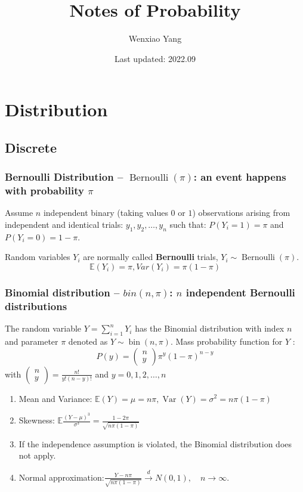 \documentclass[11pt,a4paper]{article}
\title{Notes of Probability}
\author[*]{Wenxiao Yang}
\affil[*]{Department of Mathematics, University of Illinois at Urbana-Champaign}
\date{Last updated: 2022.09}
\begin{document}
\maketitle
\tableofcontents
\newpage

\section{Distribution}

\subsection{Discrete}
\subsubsection{Bernoulli Distribution -- $\operatorname{Bernoulli}(\pi)$: an event happens with probability $\pi$}
Assume $n$ independent binary (taking values $0$ or $1$) observations arising from independent and identical trials: $y_{1}, y_{2}, \ldots, y_{n}$ such that: $P\left(Y_{i}=1\right)=\pi$ and $P\left(Y_{i}=0\right)=1-\pi$.

Random variables $Y_{i}$ are normally called \textbf{Bernoulli} trials, $Y_{i} \sim \operatorname{Bernoulli}(\pi)$. $$\mathbb{E}(Y_i)=\pi,Var(Y_i)=\pi(1-\pi)$$

\subsubsection{Binomial distribution -- $bin(n,\pi)$: $n$ independent Bernoulli distributions}
The random variable $Y=\sum_{i=1}^{n} Y_{i}$ has the Binomial distribution with index $n$ and parameter $\pi$ denoted as $Y \sim \operatorname{bin}(n, \pi)$.
Mass probability function for $Y$ :
$$
P(y)=\left(\begin{array}{l}
n \\
y
\end{array}\right) \pi^{y}(1-\pi)^{n-y}
$$
with $\left(\begin{array}{l}n \\ y\end{array}\right)=\frac{n !}{y !(n-y) !}$ and $y=0,1,2, \ldots, n$
\begin{enumerate}[(1)]
    \item Mean and Variance:
    $\mathbb{E}(Y)=\mu=n \pi,\operatorname{Var}(Y)=\sigma^{2}=n \pi(1-\pi)$
    \item Skewness: $\mathbb{E}\frac{(Y-\mu)^{3}}{\sigma^{3}}=\frac{1-2 \pi}{\sqrt{n \pi(1-\pi)}}$
    \item If the independence assumption is violated, the Binomial distribution does not apply.
    \item Normal approximation:$\frac{Y-n \pi}{\sqrt{n \pi(1-\pi)}} \stackrel{d}{\longrightarrow} N(0,1),\quad {n \rightarrow \infty}$.
\end{enumerate}
\end{document}
